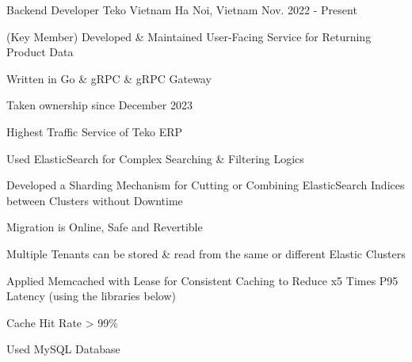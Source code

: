 


\begin{cventries}


\cventry
{Backend Developer} %
{Teko Vietnam} %
{Ha Noi, Vietnam} %
{Nov. 2022 - Present} %
{ %
\begin{cvitems}
\item{(Key Member) Developed \& Maintained User-Facing Service for Returning Product Data}
\item{Written in Go \& gRPC \& gRPC Gateway}
\item{Taken ownership since December 2023}
\item{Highest Traffic Service of Teko ERP}
\item{Used ElasticSearch for Complex Searching \& Filtering Logics}
\item{Developed a Sharding Mechanism for Cutting or Combining ElasticSearch Indices between Clusters without Downtime} 
\item{Migration is Online, Safe and Revertible}
\item{Multiple Tenants can be stored \& read from the same or different Elastic Clusters} 
\item{Applied Memcached with Lease for Consistent Caching to Reduce x5 Times P95 Latency (using the libraries below)}
\item{Cache Hit Rate > 99\%}
\item{Used MySQL Database}
\end{cvitems}
}



\end{cventries}
